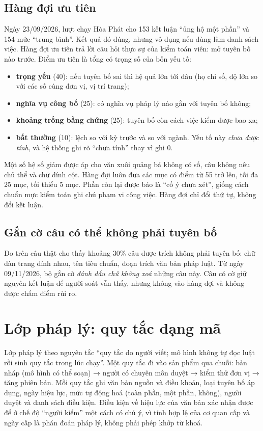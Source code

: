 \subsection{Hàng đợi ưu tiên}

Ngày 23/09/2026, lượt chạy Hòa Phát cho 153 kết luận “ủng hộ một phần” và 154 mức “trung bình”. Kết quả đó đúng, nhưng vô dụng nếu dùng làm danh sách việc. Hàng đợi ưu tiên trả lời câu hỏi thực sự của kiểm toán viên: mở tuyên bố nào trước. Điểm ưu tiên là tổng có trọng số của bốn yếu tố:
\begin{itemize}
\item \textbf{trọng yếu} (40): nếu tuyên bố sai thì hệ quả lớn tới đâu (họ chỉ số, độ lớn so với các số cùng đơn vị, vị trí trang);
\item \textbf{nghĩa vụ công bố} (25): có nghĩa vụ pháp lý nào gắn với tuyên bố không;
\item \textbf{khoảng trống bằng chứng} (25): tuyên bố còn cách việc kiểm được bao xa;
\item \textbf{bất thường} (10): lệch so với kỳ trước và so với ngành. Yếu tố này \emph{chưa được tính}, và hệ thống ghi rõ “chưa tính” thay vì ghi 0.
\end{itemize}
Một số hệ số giảm được áp cho văn xuôi quảng bá không có số, câu không nêu chủ thể và chữ dính cột. Hàng đợi luôn đưa các mục có điểm từ 55 trở lên, tối đa 25 mục, tối thiểu 5 mục. Phần còn lại được báo là “cố ý chưa xét”, giống cách chuẩn mực kiểm toán ghi chú phạm vi công việc. Hàng đợi chỉ đổi thứ tự, không đổi kết luận.

\subsection{Gắn cờ câu có thể không phải tuyên bố}

Đo trên câu thật cho thấy khoảng 30\% câu được trích không phải tuyên bố: chữ dàn trang dính nhau, tên tiêu chuẩn, đoạn trích văn bản pháp luật. Từ ngày 09/11/2026, bộ gắn cờ \emph{đánh dấu chứ không xoá} những câu này. Câu có cờ giữ nguyên kết luận để người soát vẫn thấy, nhưng không vào hàng đợi và không được chấm điểm rủi ro.

\section{Lớp pháp lý: quy tắc dạng mã}

Lớp pháp lý theo nguyên tắc “quy tắc do người viết; mô hình không tự đọc luật rồi sinh quy tắc trong lúc chạy”. Một quy tắc đi vào sản phẩm qua chuỗi: bản nháp (mô hình có thể soạn) → người có chuyên môn duyệt → kiểm thử đơn vị → tăng phiên bản. Mỗi quy tắc ghi văn bản nguồn và điều khoản, loại tuyên bố áp dụng, ngày hiệu lực, mức tự động hoá (toàn phần, một phần, không), người duyệt và danh sách điều kiện. Điều kiện về hiệu lực của văn bản xác nhận được để ở chế độ “người kiểm” một cách có chủ ý, vì tính hợp lệ của cơ quan cấp và ngày cấp là phán đoán pháp lý, không phải phép khớp từ khoá.

